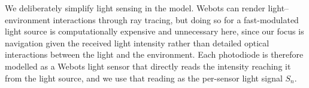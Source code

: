We deliberately simplify light sensing in the model. Webots can render light--environment interactions through ray tracing, but doing so for a fast-modulated light source is computationally expensive and unnecessary here, since our focus is navigation given the received light intensity rather than detailed optical interactions between the light and the environment. Each photodiode is therefore modelled as a Webots light sensor that directly reads the intensity reaching it from the light source, and we use that reading as the per-sensor light signal $S_n$.

